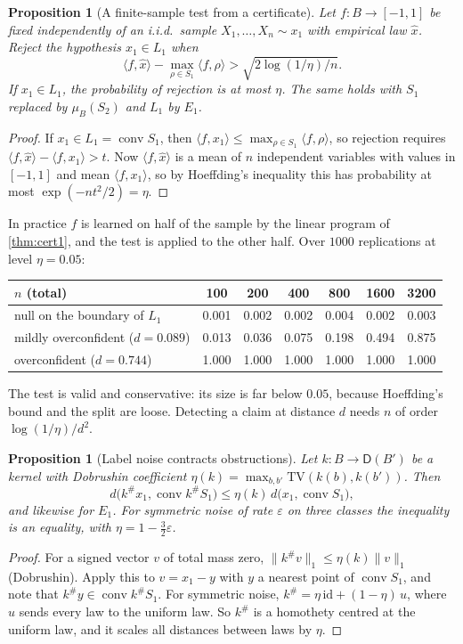 \documentclass[11pt]{article}
\newtheorem{proposition}[theorem]{Proposition}
\theoremstyle{definition}
\theoremstyle{remark}
\newcommand{\D}{\mathsf{D}}
\newcommand{\id}{\mathrm{id}}
\begin{document}
\begin{proposition}[A finite-sample test from a certificate]\label{prop:certtest}
Let $f\colon B\to[-1,1]$ be fixed independently of an i.i.d.\ sample $X_1,\dots,X_n\sim x_1$ with empirical law $\hat x$. Reject
the hypothesis $x_1\in L_1$ when
\[
\langle f,\hat x\rangle-\max_{\rho\in S_1}\langle f,\rho\rangle>\sqrt{2\log(1/\eta)/n}.
\]
If $x_1\in L_1$, the probability of rejection is at most $\eta$. The same holds with $S_1$ replaced by $\mu_B(S_2)$ and $L_1$ by $E_1$.
\end{proposition}
\begin{proof}
If $x_1\in L_1=\operatorname{conv}S_1$, then $\langle f,x_1\rangle\le\max_{\rho\in S_1}\langle f,\rho\rangle$, so rejection requires
$\langle f,\hat x\rangle-\langle f,x_1\rangle>t$. Now $\langle f,\hat x\rangle$ is a mean of $n$ independent variables with values in $[-1,1]$
and mean $\langle f,x_1\rangle$, so by Hoeffding's inequality this has probability at most $\exp(-nt^2/2)=\eta$.
\end{proof}

In practice $f$ is learned on half of the sample by the linear program of \cref{thm:cert1}, and the test is applied to
the other half. Over $1000$ replications at level $\eta=0.05$:
\begin{center}\small
\begin{tabular}{@{}lcccccc@{}}
\toprule
$n$ (total) & 100 & 200 & 400 & 800 & 1600 & 3200\\
\midrule
null on the boundary of $L_1$ & 0.001 & 0.002 & 0.002 & 0.004 & 0.002 & 0.003\\
mildly overconfident ($d=0.089$) & 0.013 & 0.036 & 0.075 & 0.198 & 0.494 & 0.875\\
overconfident ($d=0.744$) & 1.000 & 1.000 & 1.000 & 1.000 & 1.000 & 1.000\\
\bottomrule
\end{tabular}
\end{center}
The test is valid and conservative: its size is far below $0.05$, because Hoeffding's bound and the split are
loose. Detecting a claim at distance $d$ needs $n$ of order $\log(1/\eta)/d^2$.

\begin{proposition}[Label noise contracts obstructions]\label{prop:dobrushin}
Let $k\colon B\to\D(B')$ be a kernel with Dobrushin coefficient $\eta(k)=\max_{b,b'}\mathrm{TV}(k(b),k(b'))$. Then
\[
d\bigl(k^\#x_1,\operatorname{conv}k^\#S_1\bigr)\le\eta(k)\,d\bigl(x_1,\operatorname{conv}S_1\bigr),
\]
and likewise for $E_1$. For symmetric noise of rate $\varepsilon$ on three classes the inequality is an equality, with
$\eta=1-\frac32\varepsilon$.
\end{proposition}
\begin{proof}
For a signed vector $v$ of total mass zero, $\lVert k^\#v\rVert_1\le\eta(k)\lVert v\rVert_1$ (Dobrushin). Apply this to $v=x_1-y$ with
$y$ a nearest point of $\operatorname{conv}S_1$, and note that $k^\#y\in\operatorname{conv}k^\#S_1$. For symmetric noise,
$k^\#=\eta\,\id+(1-\eta)\,u$, where $u$ sends every law to the uniform law. So $k^\#$ is a homothety centred at the uniform
law, and it scales all distances between laws by $\eta$.
\end{proof}
\end{document}
